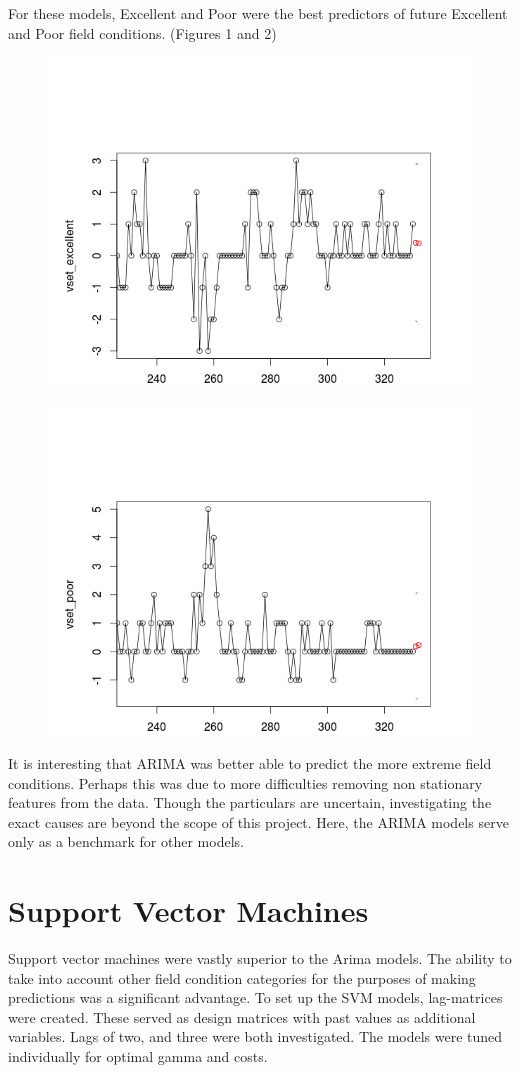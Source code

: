 \documentclass[a4paper]{apa6}
\begin{document}
For these models, Excellent and Poor were the best predictors of future Excellent and Poor field conditions. (Figures 1 and 2)
\begin{figure}
\includegraphics[width=0.8\linewidth]{excellent.png}
\caption{}
\end{figure}
\begin{figure}
\includegraphics[width=0.8\linewidth]{poor.png}
\caption{}
\end{figure}

It is interesting that ARIMA was better able to predict the more extreme field conditions. Perhaps this was due to more difficulties removing non stationary features from the data. Though the particulars are uncertain, investigating the exact causes are beyond the scope of this project.  Here, the ARIMA models serve only as a benchmark for other models.

\section*{Support Vector Machines}
Support vector machines were vastly superior to the Arima models.  The ability to take into account other field condition categories for the purposes of making predictions was a significant advantage.  To set up the SVM models, lag-matrices were created.  These served as design matrices with past values as additional variables.  Lags of two, and three were both investigated.  The models were tuned individually for optimal gamma and costs.
\end{document}
